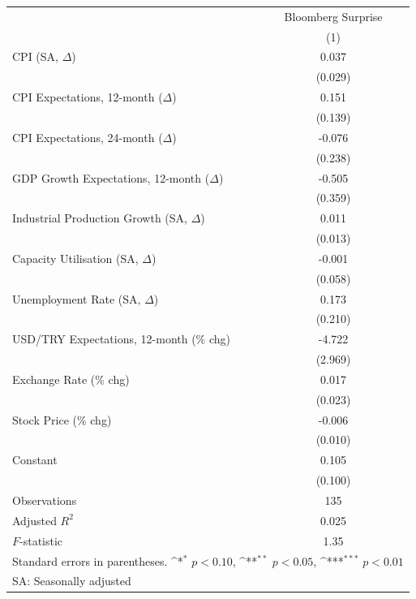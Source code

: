 \def\sym#1{\ifmmode^{#1}\else\(^{#1}\)\fi}
\begin{tabular}{l*{2}{c}}
\toprule
& Bloomberg Surprise \\
                    &\multicolumn{1}{c}{(1)}         \\
\midrule
\addlinespace CPI (SA, $\Delta$)&       0.037         \\
                    &     (0.029)         \\
CPI Expectations, 12-month ($\Delta$)&       0.151         \\
                    &     (0.139)         \\
CPI Expectations, 24-month ($\Delta$)&      -0.076         \\
                    &     (0.238)         \\
\addlinespace GDP Growth Expectations, 12-month ($\Delta$)&      -0.505         \\
                    &     (0.359)         \\
Industrial Production Growth (SA, $\Delta$)&       0.011         \\
                    &     (0.013)         \\
Capacity Utilisation (SA, $\Delta$)&      -0.001         \\
                    &     (0.058)         \\
Unemployment Rate (SA, $\Delta$)&       0.173         \\
                    &     (0.210)         \\
\addlinespace USD/TRY Expectations, 12-month (\% chg)&      -4.722         \\
                    &     (2.969)         \\
Exchange Rate (\% chg)&       0.017         \\
                    &     (0.023)         \\
Stock Price (\% chg)&      -0.006         \\
                    &     (0.010)         \\
\addlinespace Constant&       0.105         \\
                    &     (0.100)         \\
\midrule
\addlinespace Observations&         135         \\
Adjusted $R^2$      &       0.025         \\
$F$-statistic       &        1.35         \\
\bottomrule
\multicolumn{3}{l}{\footnotesize Standard errors in parentheses. \sym{*} \(p<0.10\), \sym{**} \(p<0.05\), \sym{***} \(p<0.01\)}\\
\multicolumn{3}{l}{\footnotesize SA: Seasonally adjusted}\\
\end{tabular}
